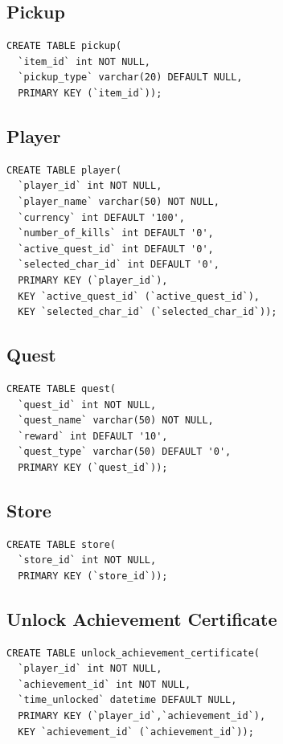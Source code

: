 \documentclass[12pt]{report}
\begin{document}
\subsection{Pickup}
\begin{verbatim}
CREATE TABLE pickup(
  `item_id` int NOT NULL,
  `pickup_type` varchar(20) DEFAULT NULL,
  PRIMARY KEY (`item_id`));
\end{verbatim}

\subsection{Player}
\begin{verbatim}
CREATE TABLE player(
  `player_id` int NOT NULL,
  `player_name` varchar(50) NOT NULL,
  `currency` int DEFAULT '100',
  `number_of_kills` int DEFAULT '0',
  `active_quest_id` int DEFAULT '0',
  `selected_char_id` int DEFAULT '0',
  PRIMARY KEY (`player_id`),
  KEY `active_quest_id` (`active_quest_id`),
  KEY `selected_char_id` (`selected_char_id`));
\end{verbatim}
\subsection{Quest}
\begin{verbatim}
CREATE TABLE quest(
  `quest_id` int NOT NULL,
  `quest_name` varchar(50) NOT NULL,
  `reward` int DEFAULT '10',
  `quest_type` varchar(50) DEFAULT '0',
  PRIMARY KEY (`quest_id`));

\end{verbatim}
\subsection{Store}
\begin{verbatim}
CREATE TABLE store(
  `store_id` int NOT NULL,
  PRIMARY KEY (`store_id`));

\end{verbatim}
\subsection{Unlock Achievement Certificate}
\begin{verbatim}
CREATE TABLE unlock_achievement_certificate(
  `player_id` int NOT NULL,
  `achievement_id` int NOT NULL,
  `time_unlocked` datetime DEFAULT NULL,
  PRIMARY KEY (`player_id`,`achievement_id`),
  KEY `achievement_id` (`achievement_id`));
\end{verbatim}
\end{document}
